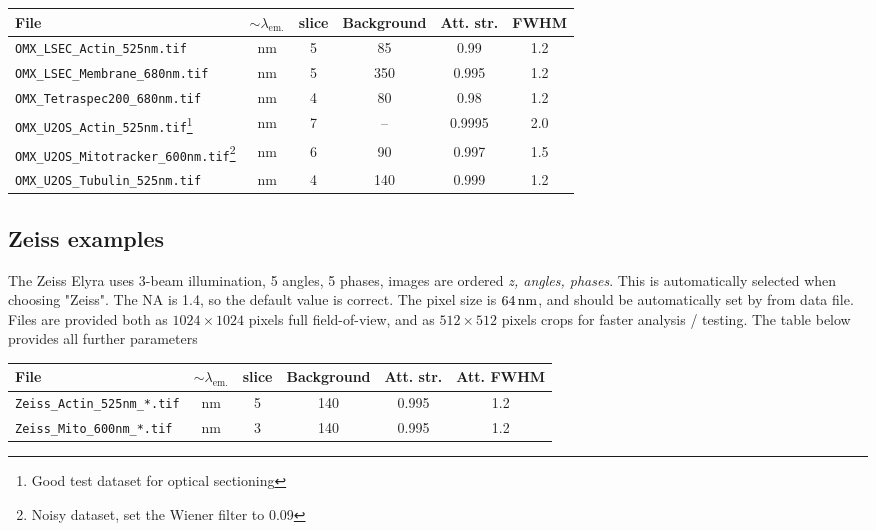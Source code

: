 \documentclass[twoside=false,
           twocolumn=false,
           a4paper,DIV=15,
           10pt]{scrartcl}
\begin{document}
\begin{minipage}[l]{.87\textwidth}
\begin{tabular}{lccccc}
File & $\sim \lambda_\text{em.}$ & slice & Background & Att. str. & {\footnotesize FWHM} \\
\hline 
\verb+OMX_LSEC_Actin_525nm.tif+		& \unit[525]{nm} & 5 & 85  & 0.99  & 1.2 \\ 
\verb+OMX_LSEC_Membrane_680nm.tif+	& \unit[680]{nm} & 5 & 350 & 0.995 & 1.2 \\ 
\verb+OMX_Tetraspec200_680nm.tif+	& \unit[680]{nm} & 4 & 80  & 0.98  & 1.2 \\  
\verb+OMX_U2OS_Actin_525nm.tif+\footnote{Good test dataset for optical sectioning}
& \unit[525]{nm} & 7 & --  & 0.9995 & 2.0 \\ 
\verb+OMX_U2OS_Mitotracker_600nm.tif+\footnote{Noisy dataset, set the Wiener filter to
0.09}
& \unit[600]{nm} & 6 & 90  & 0.997  & 1.5 \\ 
\verb+OMX_U2OS_Tubulin_525nm.tif+	& \unit[525]{nm} & 4 & 140 & 0.999 & 1.2 \\ 
\end{tabular}
\end{minipage}


\subsection{Zeiss examples}

The Zeiss Elyra uses 3-beam illumination, 5 angles, 5 phases,
images are ordered \emph{z, angles, phases}. This is automatically
selected when choosing "Zeiss". The NA is 1.4, so the default
value is correct. The pixel size is $\unit[64]{nm}$, and
should be automatically set by from data file. Files are
provided both as $1024\times 1024$ pixels full field-of-view,
and as $512\times 512$ pixels crops for faster analysis / testing.
The table below provides all further parameters

\begin{center}
\begin{tabular}{lccccc}
File & $\sim \lambda_\text{em.}$ & slice & Background &Att. str. & Att. FWHM \\
\hline
\verb+Zeiss_Actin_525nm_*.tif+  & \unit[525]{nm} & 5 & 140 & 0.995 & 1.2 \\
\verb+Zeiss_Mito_600nm_*.tif+   & \unit[600]{nm} & 3 & 140 & 0.995 & 1.2 \\
\end{tabular}
\end{center}
\end{document}
